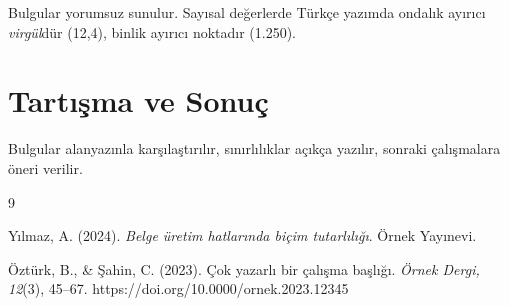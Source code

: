 \documentclass[12pt,a4paper]{article}
\begin{document}
Bulgular yorumsuz sunulur. Sayısal değerlerde Türkçe yazımda ondalık ayırıcı
\emph{virgül}dür (12,4), binlik ayırıcı noktadır (1.250).

\section{Tartışma ve Sonuç}

Bulgular alanyazınla karşılaştırılır, sınırlılıklar açıkça yazılır, sonraki
çalışmalara öneri verilir.

%
%        

\begin{thebibliography}{9}

Yılmaz, A. (2024). \emph{Belge üretim hatlarında biçim tutarlılığı}. Örnek Yayınevi.

Öztürk, B., \& Şahin, C. (2023). Çok yazarlı bir çalışma başlığı.
\emph{Örnek Dergi, 12}(3), 45--67. https://doi.org/10.0000/ornek.2023.12345

\end{thebibliography}
\end{document}
